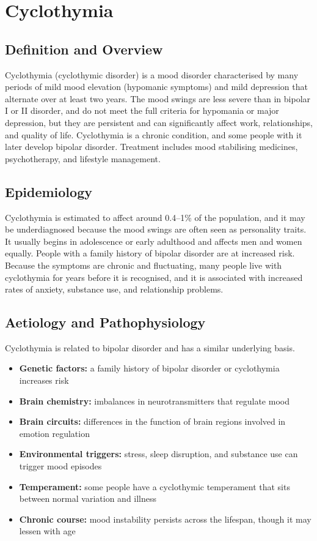 \chapter{Cyclothymia}

\section*{Definition and Overview}
Cyclothymia (cyclothymic disorder) is a mood disorder characterised by many periods of mild mood elevation (hypomanic symptoms) and mild depression that alternate over at least two years. The mood swings are less severe than in bipolar I or II disorder, and do not meet the full criteria for hypomania or major depression, but they are persistent and can significantly affect work, relationships, and quality of life. Cyclothymia is a chronic condition, and some people with it later develop bipolar disorder. Treatment includes mood stabilising medicines, psychotherapy, and lifestyle management.

\section*{Epidemiology}
Cyclothymia is estimated to affect around 0.4--1\% of the population, and it may be underdiagnosed because the mood swings are often seen as personality traits. It usually begins in adolescence or early adulthood and affects men and women equally. People with a family history of bipolar disorder are at increased risk. Because the symptoms are chronic and fluctuating, many people live with cyclothymia for years before it is recognised, and it is associated with increased rates of anxiety, substance use, and relationship problems.

\section*{Aetiology and Pathophysiology}
Cyclothymia is related to bipolar disorder and has a similar underlying basis.

\begin{itemize}
    \item \textbf{Genetic factors:} a family history of bipolar disorder or cyclothymia increases risk
    \item \textbf{Brain chemistry:} imbalances in neurotransmitters that regulate mood
    \item \textbf{Brain circuits:} differences in the function of brain regions involved in emotion regulation
    \item \textbf{Environmental triggers:} stress, sleep disruption, and substance use can trigger mood episodes
    \item \textbf{Temperament:} some people have a cyclothymic temperament that sits between normal variation and illness
    \item \textbf{Chronic course:} mood instability persists across the lifespan, though it may lessen with age
\end{itemize}

